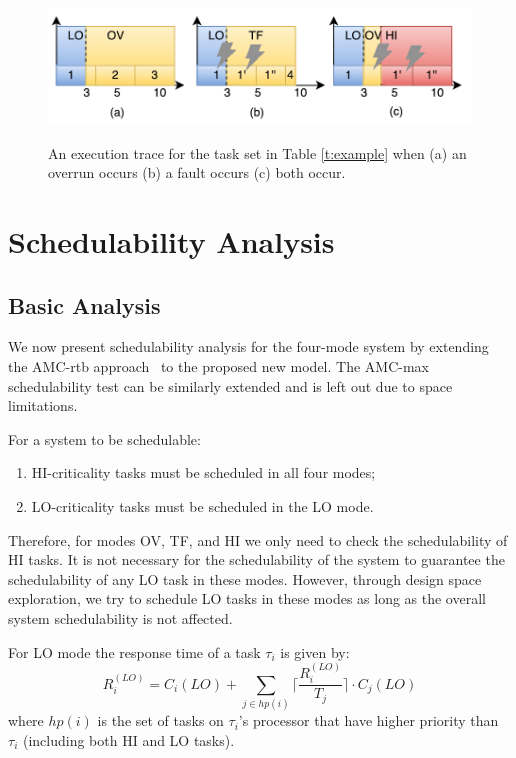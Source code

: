 \documentclass[conference]{IEEEtran}
\begin{document}
\begin{figure}[t!]
  \centering
  \includegraphics[width=1.0\textwidth]{images/sched_example.pdf}\\
  \caption{An execution trace for the task set in Table \ref{t:example} when (a) an overrun occurs (b) a fault occurs (c) both occur.}
  \label{fig:example}
\end{figure}



\section{Schedulability Analysis}
\label{sec:schedA}

\subsection{Basic Analysis}
\label{sec:basic}
We now present schedulability analysis for the four-mode system by extending the AMC-rtb approach~\cite{baruah2011response} to the proposed new model. The AMC-max schedulability test \cite{baruah2011response} can be similarly extended and is left out due to space limitations.

For a system to be schedulable:
\begin{enumerate}[topsep=-5pt]
\item HI-criticality tasks must be scheduled in all four modes;
\item LO-criticality tasks must be scheduled in the LO mode.
\end{enumerate}
Therefore, for modes OV, TF, and HI we only need to check the schedulability of HI tasks. It is not necessary for the schedulability of the system to guarantee the schedulability of any LO task in these modes. However, through design space exploration, we try to schedule LO tasks in these modes as long as the overall system schedulability is not affected.

For LO mode the response time of a task $\tau_i$ is given by:
\begin{equation}
R_i^{(LO)}= C_i(LO)+\sum_{j \in hp(i)}\Big\lceil\frac{R_i^{(LO)}}{T_j}\Big\rceil \cdot C_j(LO)
\label{eq:mode1}
\end{equation}
%
where $hp(i)$ is the set of tasks on $\tau_i$'s processor that have higher priority than $\tau_i$ (including both HI and LO tasks).
\end{document}
